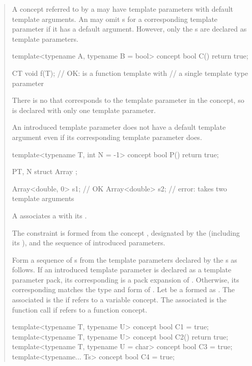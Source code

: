 \begin{quote}
\pnum
\enternote
A concept referred to by a  may have template 
parameters with default template arguments. An  
may omit s for a corresponding template
parameter if it has a default argument. 
% 
However, only the s are declared
as template parameters. 
% 
\enterexample
\begin{codeblock}
template<typename A, typename B = bool> concept bool C() { return true; }

C{T} void f(T); // OK:  is a function template with
                // a single template type parameter 
\end{codeblock}
There is no  that corresponds to the 
template parameter  in the  concept, so  is 
declared with only one template parameter.
\exitexample
\exitnote


\pnum
An introduced template parameter does not have a default template argument 
even if its corresponding template parameter does.
% 
\enterexample
\begin{codeblock}
template<typename T, int N = -1> concept bool P() { return true; }

P{T, N} struct Array { };

Array<double, 0> s1; // OK
Array<double> s2;    // error:  takes two template arguments
\end{codeblock}
\exitexample


\pnum
A  associates a 
 with its
.

The constraint is formed from the concept , designated by the
 (including its
), 
and the sequence of introduced parameters.

Form a sequence of s
 from the template parameters declared by the
s as follows. 
% 
If an introduced template parameter  is declared as a template 
parameter pack, its corresponding  is a pack
expansion of . 
% 
% 
Otherwise, its corresponding  matches the 
type and form of .
% 
Let  be a 
formed as .
% 
The associated  is
the  
if  refers to a variable concept. 
% 
The associated  is
the function call  if  refers to a function 
concept.
% 
\enterexample
\begin{codeblock}
template<typename T, typename U> concept bool C1 = true;
template<typename T, typename U> concept bool C2() { return true; }
template<typename T, typename U = char> concept bool C3 = true;
template<typename... Ts> concept bool C4 = true;


\end{codeblock}
\end{quote}
